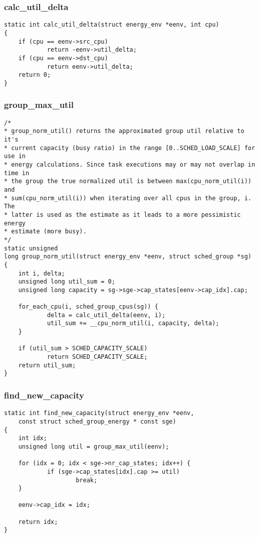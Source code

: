 \documentclass{article}
\begin{document}
\subsubsection{calc\_util\_delta}

\begin{verbatim}
static int calc_util_delta(struct energy_env *eenv, int cpu)
{
    if (cpu == eenv->src_cpu)
            return -eenv->util_delta;
    if (cpu == eenv->dst_cpu)
            return eenv->util_delta;
    return 0;
}
\end{verbatim}

\subsubsection{group\_max\_util}

\begin{verbatim}
/*
* group_norm_util() returns the approximated group util relative to it's
* current capacity (busy ratio) in the range [0..SCHED_LOAD_SCALE] for use in
* energy calculations. Since task executions may or may not overlap in time in
* the group the true normalized util is between max(cpu_norm_util(i)) and
* sum(cpu_norm_util(i)) when iterating over all cpus in the group, i. The
* latter is used as the estimate as it leads to a more pessimistic energy
* estimate (more busy).
*/
static unsigned
long group_norm_util(struct energy_env *eenv, struct sched_group *sg)
{
    int i, delta;
    unsigned long util_sum = 0;
    unsigned long capacity = sg->sge->cap_states[eenv->cap_idx].cap;

    for_each_cpu(i, sched_group_cpus(sg)) {
            delta = calc_util_delta(eenv, i);
            util_sum += __cpu_norm_util(i, capacity, delta);
    }

    if (util_sum > SCHED_CAPACITY_SCALE)
            return SCHED_CAPACITY_SCALE;
    return util_sum;
}
\end{verbatim}

\subsubsection{find\_new\_capacity}

\begin{verbatim}
static int find_new_capacity(struct energy_env *eenv,
    const struct sched_group_energy * const sge)
{
    int idx;
    unsigned long util = group_max_util(eenv);

    for (idx = 0; idx < sge->nr_cap_states; idx++) {
            if (sge->cap_states[idx].cap >= util)
                    break;
    }

    eenv->cap_idx = idx;

    return idx;
}
\end{verbatim}
\end{document}
